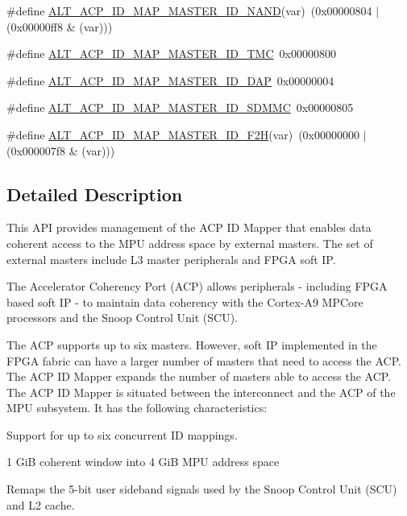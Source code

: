\begin{DoxyCompactItemize}
\#define \mbox{\hyperlink{group__ADDR__SPACE__MGR__MEM__COHERENCE_ga6853514e5a6a6ac31d1c7f1cf7328403}{A\+L\+T\+\_\+\+A\+C\+P\+\_\+\+I\+D\+\_\+\+M\+A\+P\+\_\+\+M\+A\+S\+T\+E\+R\+\_\+\+I\+D\+\_\+\+N\+A\+ND}}(var)~(0x00000804 $\vert$ (0x00000ff8 \& (var)))
\item 
\#define \mbox{\hyperlink{group__ADDR__SPACE__MGR__MEM__COHERENCE_ga3961fc747ad5038dc5ac3969ce01812b}{A\+L\+T\+\_\+\+A\+C\+P\+\_\+\+I\+D\+\_\+\+M\+A\+P\+\_\+\+M\+A\+S\+T\+E\+R\+\_\+\+I\+D\+\_\+\+T\+MC}}~0x00000800
\item 
\#define \mbox{\hyperlink{group__ADDR__SPACE__MGR__MEM__COHERENCE_ga753431b5fe93c48c23c2109527a05bf7}{A\+L\+T\+\_\+\+A\+C\+P\+\_\+\+I\+D\+\_\+\+M\+A\+P\+\_\+\+M\+A\+S\+T\+E\+R\+\_\+\+I\+D\+\_\+\+D\+AP}}~0x00000004
\item 
\#define \mbox{\hyperlink{group__ADDR__SPACE__MGR__MEM__COHERENCE_ga09b12d61f02f9c0b8f7eb344a0f8c2c8}{A\+L\+T\+\_\+\+A\+C\+P\+\_\+\+I\+D\+\_\+\+M\+A\+P\+\_\+\+M\+A\+S\+T\+E\+R\+\_\+\+I\+D\+\_\+\+S\+D\+M\+MC}}~0x00000805
\item 
\#define \mbox{\hyperlink{group__ADDR__SPACE__MGR__MEM__COHERENCE_gabf8b5224e6c619582bdaf414e0ae88f4}{A\+L\+T\+\_\+\+A\+C\+P\+\_\+\+I\+D\+\_\+\+M\+A\+P\+\_\+\+M\+A\+S\+T\+E\+R\+\_\+\+I\+D\+\_\+\+F2H}}(var)~(0x00000000 $\vert$ (0x000007f8 \& (var)))
\end{DoxyCompactItemize}


\subsection{Detailed Description}
This A\+PI provides management of the A\+CP ID Mapper that enables data coherent access to the M\+PU address space by external masters. The set of external masters include L3 master peripherals and F\+P\+GA soft IP.

The Accelerator Coherency Port (A\+CP) allows peripherals -\/ including F\+P\+GA based soft IP -\/ to maintain data coherency with the Cortex-\/\+A9 M\+P\+Core processors and the Snoop Control Unit (S\+CU).

The A\+CP supports up to six masters. However, soft IP implemented in the F\+P\+GA fabric can have a larger number of masters that need to access the A\+CP. The A\+CP ID Mapper expands the number of masters able to access the A\+CP. The A\+CP ID Mapper is situated between the interconnect and the A\+CP of the M\+PU subsystem. It has the following characteristics\+:
\begin{DoxyItemize}
\item Support for up to six concurrent ID mappings.
\item 1 GiB coherent window into 4 GiB M\+PU address space
\item Remaps the 5-\/bit user sideband signals used by the Snoop Control Unit (S\+CU) and L2 cache.
\end{DoxyItemize}

